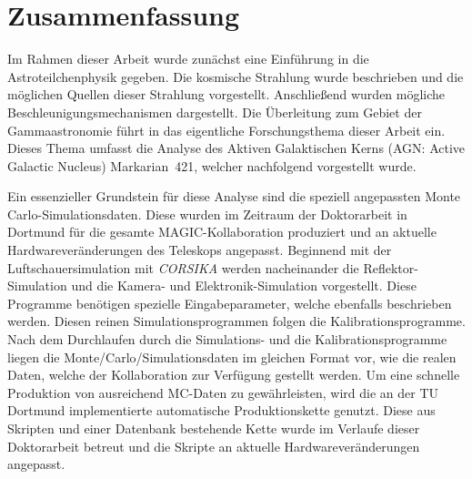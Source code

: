 \chapter{Zusammenfassung}
\label{chapter:Ergebnisse}
Im Rahmen dieser Arbeit wurde zunächst eine Einführung in die Astroteilchenphysik gegeben. 
Die kosmische Strahlung wurde beschrieben und die möglichen Quellen dieser Strahlung vorgestellt.
Anschließend wurden mögliche Beschleunigungsmechanismen dargestellt.
Die Überleitung zum Gebiet der Gammaastronomie führt in das eigentliche Forschungsthema dieser Arbeit ein.
Dieses Thema umfasst die Analyse des Aktiven Galaktischen Kerns (AGN: Active Galactic Nucleus) Markarian~421, welcher nachfolgend vorgestellt wurde.

Ein essenzieller Grundstein für diese Analyse sind die speziell angepassten Monte Carlo-Simulationsdaten.
Diese wurden im Zeitraum der Doktorarbeit in Dortmund für die gesamte MAGIC-Kollaboration produziert und an aktuelle Hardwareveränderungen des Teleskops angepasst.
Beginnend mit der Luftschauersimulation mit \textit{CORSIKA} werden nacheinander die Reflektor-Simulation und die Kamera- und Elektronik-Simulation vorgestellt.
Diese Programme benötigen spezielle Eingabeparameter, welche ebenfalls beschrieben werden.
Diesen reinen Simulationsprogrammen folgen die Kalibrationsprogramme. 
Nach dem Durchlaufen durch die Simulations- und die Kalibrationsprogramme liegen die Monte\-/Carlo\-/Simulationsdaten im gleichen Format vor, wie die realen Daten, welche der Kollaboration zur Verfügung gestellt werden.
Um eine schnelle Produktion von ausreichend MC-Daten zu gewährleisten, wird die an der TU Dortmund implementierte automatische Produktionskette genutzt.
Diese aus Skripten und einer Datenbank bestehende Kette wurde im Verlaufe dieser Doktorarbeit betreut und die Skripte an aktuelle Hardwareveränderungen angepasst.

